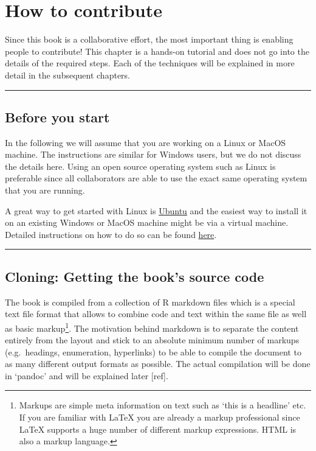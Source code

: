 \documentclass[]{book}
\let\rmarkdownfootnote\footnote%
\def\footnote{\protect\rmarkdownfootnote}
\begin{document}
\chapter{How to contribute}\label{chptr-how-to-contribute}

Since this book is a collaborative effort, the most important thing is
enabling people to contribute! This chapter is a hands-on tutorial and
does not go into the details of the required steps. Each of the
techniques will be explained in more detail in the subsequent chapters.

\begin{center}\rule{0.5\linewidth}{\linethickness}\end{center}

\section{Before you start}\label{before-you-start}

In the following we will assume that you are working on a Linux or MacOS
machine. The instructions are similar for Windows users, but we do not
discuss the details here. Using an open source operating system such as
Linux is preferable since all collaborators are able to use the exact
same operating system that you are running.

A great way to get started with Linux is
\href{https://www.ubuntu.com/download/desktop}{Ubuntu} and the easiest
way to install it on an existing Windows or MacOS machine might be via a
virtual machine. Detailed instructions on how to do so can be found
\href{https://www.wikihow.com/Install-Ubuntu-on-VirtualBox}{here}.

\begin{center}\rule{0.5\linewidth}{\linethickness}\end{center}

\section{Cloning: Getting the book's source
code}\label{cloning-getting-the-books-source-code}

The book is compiled from a collection of R markdown files which is a
special text file format that allows to combine code and text within the
same file as well as basic markup\footnote{Markups are simple meta
  information on text such as `this is a headline' etc. If you are
  familiar with LaTeX you are already a markup professional since LaTeX
  supports a huge number of different markup expressions. HTML is also a
  markup language.}. The motivation behind markdown is to separate the
content entirely from the layout and stick to an absolute minimum number
of markups (e.g.~headings, enumeration, hyperlinks) to be able to
compile the document to as many different output formats as possible.
The actual compilation will be done in `pandoc' and will be explained
later {[}ref{]}.
\end{document}
